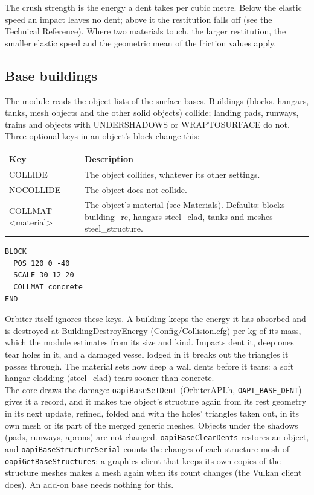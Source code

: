 \documentclass[Orbiter Developer Manual.tex]{subfiles}
\begin{document}
\begin{sloppypar}
\noindent
The crush strength is the energy a dent takes per cubic metre. Below the elastic speed an impact leaves no dent; above it the restitution falls off (see the Technical Reference). Where two materials touch, the larger restitution, the smaller elastic speed and the geometric mean of the friction values apply.


\subsection{Base buildings}
The module reads the object lists of the surface bases. Buildings (blocks, hangars, tanks, mesh objects and the other solid objects) collide; landing pads, runways, trains and objects with UNDERSHADOWS or WRAPTOSURFACE do not. Three optional keys in an object's block change this:

	\begin{longtable}{ |p{}|p{}| }
	\hline\rule{0pt}{2ex}
	\textbf{Key} & \textbf{Description}\\
	\hline\rule{0pt}{2ex}
	COLLIDE & The object collides, whatever its other settings.\\
	\hline\rule{0pt}{2ex}
	NOCOLLIDE & The object does not collide.\\
	\hline\rule{0pt}{2ex}
	COLLMAT <material> & The object's material (see Materials). Defaults: blocks building\_rc, hangars steel\_clad, tanks and meshes steel\_structure.\\
	\hline
	\end{longtable}

\begin{lstlisting}[language=OSFS]
BLOCK
  POS 120 0 -40
  SCALE 30 12 20
  COLLMAT concrete
END
\end{lstlisting}

\noindent
Orbiter itself ignores these keys. A building keeps the energy it has absorbed and is destroyed at BuildingDestroyEnergy (Config/Collision.cfg) per kg of its mass, which the module estimates from its size and kind. Impacts dent it, deep ones tear holes in it, and a damaged vessel lodged in it breaks out the triangles it passes through. The material sets how deep a wall dents before it tears: a soft hangar cladding (steel\_clad) tears sooner than concrete.\\
The core draws the damage: \texttt{oapiBaseSetDent} (OrbiterAPI.h, \texttt{OAPI\_BASE\_DENT}) gives it a record, and it makes the object's structure again from its rest geometry in its next update, refined, folded and with the holes' triangles taken out, in its own mesh or its part of the merged generic meshes. Objects under the shadows (pads, runways, aprons) are not changed. \texttt{oapiBaseClearDents} restores an object, and \texttt{oapiBaseStructureSerial} counts the changes of each structure mesh of \texttt{oapiGetBaseStructures}: a graphics client that keeps its own copies of the structure meshes makes a mesh again when its count changes (the Vulkan client does). An add-on base needs nothing for this.



\end{sloppypar}
\end{document}

